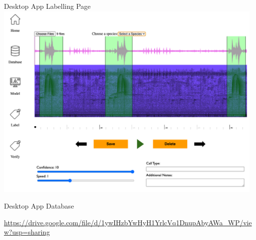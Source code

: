 \begin{frame}{Desktop App Labelling Page}
    \centering
    \includegraphics[height=0.99\textheight,width=0.99\textwidth,keepaspectratio]{images/labelling_page.png}
\end{frame}

\begin{frame}{Desktop App Database}

    \url{https://drive.google.com/file/d/1ywIHzbYwHyH1YrlcVq1DnupAbyAWa_WP/view?usp=sharing}

\end{frame}